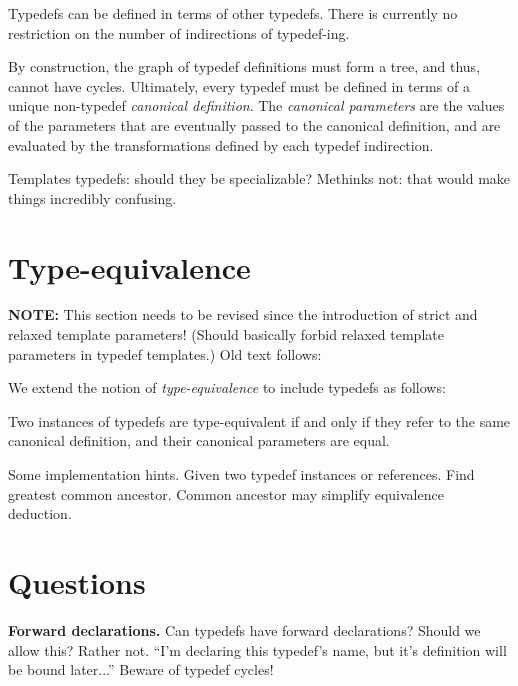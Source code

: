 Typedefs can be defined in terms of other typedefs.  
There is currently no restriction on the number of indirections
of typedef-ing.  

By construction, the graph of typedef definitions must form a tree,
and thus, cannot have cycles.  
Ultimately, every typedef must be defined in terms of a 
unique non-typedef \emph{canonical definition}.  
The \emph{canonical parameters} are the values of the 
parameters that are eventually passed to the canonical definition, 
and are evaluated by the transformations defined by each typedef indirection.  

Templates typedefs: should they be specializable?  
Methinks not: that would make things incredibly confusing.  


\section{Type-equivalence}
\label{sec:typedefs:equivalence}


\textbf{NOTE:} This section needs to be revised
since the introduction of strict and relaxed template parameters!  
(Should basically forbid relaxed template parameters in typedef templates.)
Old text follows:

We extend the notion of \emph{type-equivalence} to include typedefs as follows:

Two instances of typedefs are type-equivalent if and only if
they refer to the same canonical definition, and their canonical 
parameters are equal.  

Some implementation hints.
Given two typedef instances or references.  
Find greatest common ancestor.  
Common ancestor may simplify equivalence deduction.  


\section{Questions}
\label{sec:typedefs:questions}

\textbf{Forward declarations.}
Can typedefs have forward declarations?  Should we allow this?  Rather not.
``I'm declaring this typedef's name, but it's definition will be bound
later...''
Beware of typedef cycles!

